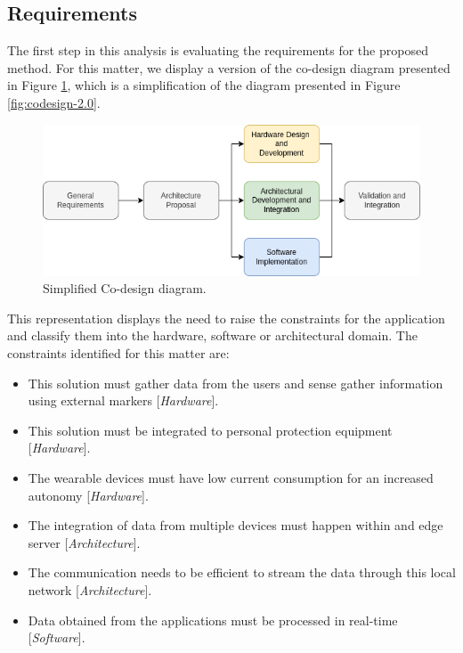 \subsection{Requirements}

The first step in this analysis is evaluating the requirements for the proposed method. For this matter, we display a version of the co-design diagram presented in Figure \ref{fig:simplified-codesign-5}, which is a simplification of the diagram presented in Figure \ref{fig:codesign-2.0}. 

\begin{figure}[ht!]
    \centering
    \includegraphics[width = .8\linewidth]{Figures/simplified-codesign.png}
    \caption{Simplified Co-design diagram.}
    \label{fig:simplified-codesign-5}
\end{figure}

This representation displays the need to raise the constraints for the application and classify them into the hardware, software or architectural domain. The constraints identified for this matter are:

\begin{itemize}
    \item This solution must gather data from the users and sense gather information using external markers [\textit{Hardware}].
    \item This solution must be integrated to personal protection equipment [\textit{Hardware}].
    \item The wearable devices must have low current consumption for an increased autonomy [\textit{Hardware}].
    \item The integration of data from multiple devices must happen within and edge server [\textit{Architecture}].
    \item The communication needs to be efficient to stream the data through this local network [\textit{Architecture}].
    \item Data obtained from the applications must be processed in real-time [\textit{Software}].
\end{itemize}

